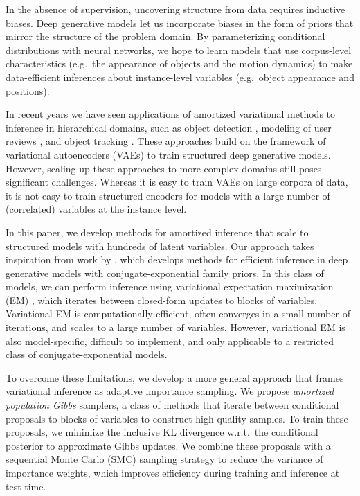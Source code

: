 \documentclass{article}
\theoremstyle{definition}
\begin{document}
In the absence of supervision, uncovering structure from data requires inductive biases. Deep generative models let us incorporate biases in the form of priors that mirror the structure of the problem domain. 
By parameterizing conditional distributions with neural networks, we hope to learn models that use corpus-level characteristics (e.g.~the appearance of objects and the motion dynamics) to make data-efficient inferences about instance-level variables (e.g.~object appearance and positions).

In recent years we have seen applications of amortized variational methods to inference in hierarchical domains, such as object detection \cite{eslami2016attend}, modeling of user reviews \cite{esmaeili2019structured}, and object tracking \cite{kosiorek2018sequential}. These approaches build on the framework of variational autoencoders (VAEs) \cite{kingma2013auto-encoding, rezende2014stochastic} to train structured deep generative models. However, scaling up these approaches to more complex domains still poses significant challenges. Whereas it is easy to train VAEs on large corpora of data, it is not easy to train structured encoders for models with a large number of (correlated) variables at the instance level. 

In this paper, we develop methods for amortized inference that scale to structured models with hundreds of latent variables. Our approach takes inspiration from work by \citet{johnson2016composing}, which develops methods for efficient inference in deep generative models with conjugate-exponential family priors. In this class of models, we can perform inference using variational expectation maximization (EM)  \cite{beal2003variational,bishop2006pattern,wainwright2008graphical}, which iterates between closed-form updates to blocks of variables. Variational EM is computationally efficient, often converges in a small number of iterations, and scales to a large number of variables. However, variational EM is also model-specific, difficult to implement, and only applicable to a restricted class of conjugate-exponential models.

To overcome these limitations, we develop a more general approach that frames variational inference as adaptive importance sampling. We propose \emph{amortized population Gibbs} samplers, a class of methods that iterate between conditional proposals to blocks of variables to construct high-quality samples. To train these proposals, we minimize the inclusive KL divergence w.r.t.~the conditional posterior to approximate Gibbs updates. We combine these proposals with a sequential Monte Carlo (SMC) sampling strategy to reduce the variance of importance weights, which improves efficiency during training and inference at test time.
\end{document}
